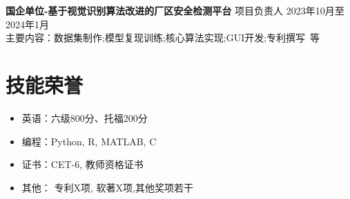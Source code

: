     \vspace{0.5em}
    {\large{\textbf{国企单位-基于视觉识别算法改进的厂区安全检测平台}}} 项目负责人 \hfill {2023年10月至2024年1月}\\
    主要内容：数据集制作;模型复现训练;核心算法实现;GUI开发;专利撰写\ 等

    \section{\makebox[\widthof{\faWrench}][c]{\color{SWU_Blue}{\faWrench}}\quad 技能荣誉 }
    \vspace{0.5em}
    \begin{itemize}
        \item 英语：六级800分、托福200分
        \item 编程：Python, R, MATLAB, C
        \item 证书：CET-6, 教师资格证书
        \item 其他： 专利X项, 软著X项,其他奖项若干
    \end{itemize}
    


    
    
